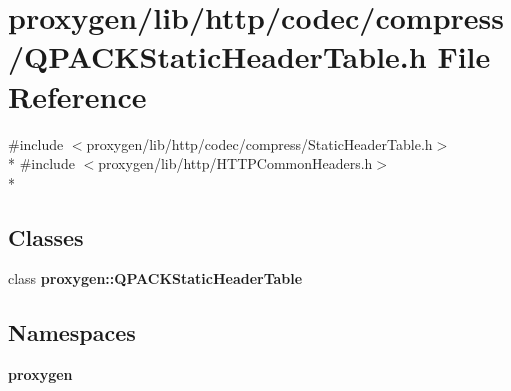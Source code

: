 \section{proxygen/lib/http/codec/compress/\+Q\+P\+A\+C\+K\+Static\+Header\+Table.h File Reference}
\label{QPACKStaticHeaderTable_8h}
{\ttfamily \#include $<$proxygen/lib/http/codec/compress/\+Static\+Header\+Table.\+h$>$}\\*
{\ttfamily \#include $<$proxygen/lib/http/\+H\+T\+T\+P\+Common\+Headers.\+h$>$}\\*
\subsection*{Classes}
\begin{DoxyCompactItemize}
\item 
class {\bf proxygen\+::\+Q\+P\+A\+C\+K\+Static\+Header\+Table}
\end{DoxyCompactItemize}
\subsection*{Namespaces}
\begin{DoxyCompactItemize}
\item 
 {\bf proxygen}
\end{DoxyCompactItemize}
